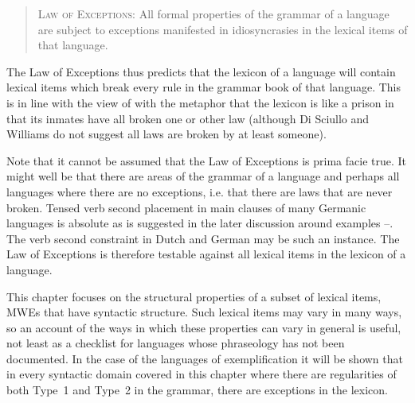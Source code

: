 \documentclass[output=paper]{langsci/langscibook}
\begin{document}
\begin{quote}
\textsc{Law of Exceptions:} All formal properties of the grammar of a language are subject to exceptions manifested in idiosyncrasies in the lexical items of that language.
\end{quote}

The Law of Exceptions thus predicts that the lexicon of a language will 
contain lexical items which break every rule in the grammar book of that 
language. This is in line with the view of \citet{DiSciullo1987} with the 
metaphor that the lexicon is like a prison in that its inmates have all 
broken one or other law (although Di Sciullo and Williams do not suggest 
all laws are broken by at least someone). 

Note that it cannot be assumed that the Law of Exceptions is prima facie 
true. It might well be that there are areas of the grammar of a language 
and perhaps all languages where there are no exceptions, i.e. that there 
are laws that are never broken. Tensed verb second placement in main 
clauses of many Germanic languages is absolute as is suggested in the 
later discussion around examples --. The verb 
second constraint in Dutch and German may be such an instance. 
 
The Law of Exceptions is therefore testable against all lexical items in the lexicon 
of a language. 

This chapter focuses on the structural properties of a subset of lexical items, MWEs that have syntactic structure. Such lexical items may vary in many ways, so an account of the ways in which these properties can vary in general is useful, not least as a checklist for languages whose phraseology has not been documented. In the case of the languages of exemplification it will be shown that in every syntactic domain covered in this chapter where there are regularities of both Type~1 and Type~2 in the grammar, there are exceptions in the lexicon.
\end{document}

